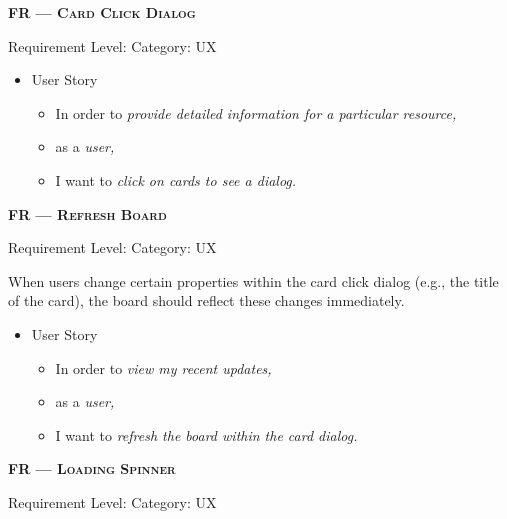 \centerline{\textbf{FR\textsubscript{} --- \textsc{Card Click Dialog}}}
\centerline{\small Requirement Level:  \quad{} Category: \acrshort*{UX}}


\begin{itemize}[after=\vspace{1em}]
    \setlength\itemsep{-0.5em}
	\item[] User Story\\[-7.8mm]
	\begin{itemize}
    \setlength\itemsep{-0.5em}
        \item[] In order to \textit{provide detailed information for a particular resource,}
        \item[] as a \textit{user,}
        \item[] I want to \textit{click on cards to see a dialog.}
    \end{itemize}
\end{itemize}

 
 


\centerline{\textbf{FR\textsubscript{} --- \textsc{Refresh Board}}}
\centerline{\small Requirement Level:  \quad{} Category: \acrshort*{UX}}

\noindent When users change certain properties within the card click dialog (e.g., the title of the card), the board should reflect these changes immediately.

\begin{itemize}[after=\vspace{1em}]
    \setlength\itemsep{-0.5em}
	\item[] User Story\\[-7.8mm]
	\begin{itemize}
    \setlength\itemsep{-0.5em}
        \item[] In order to \textit{view my recent updates,}
        \item[] as a \textit{user,}
        \item[] I want to \textit{refresh the board within the card dialog.}
    \end{itemize}
\end{itemize}



\centerline{\textbf{FR\textsubscript{} --- \textsc{Loading Spinner}}}
\centerline{\small Requirement Level:  \quad{} Category: \acrshort*{UX}}

